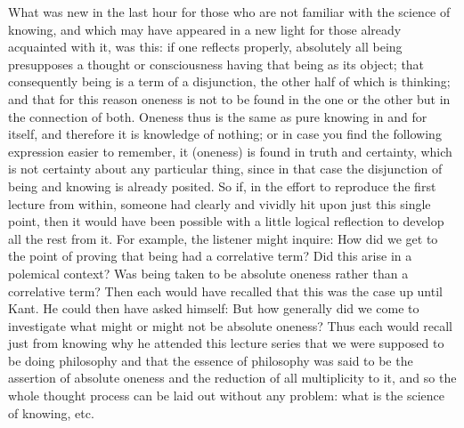 What was new in the last hour for those who are not familiar with
the science of knowing, and which may have appeared in a new light
for those already acquainted with it, was this:
if one reflects properly, absolutely all being presupposes
a thought or consciousness having that being as its object;
that consequently being is a term of a disjunction,
the other half of which is thinking;
and that for this reason oneness is not to be found
in the one or the other but in the connection of both.
Oneness thus is the same as pure knowing in and for itself,
and therefore it is knowledge of nothing;
or in case you find the following expression easier to remember,
it (oneness) is found in truth and certainty,
which is not certainty about any particular thing,
since in that case the disjunction of being and knowing is already posited.
So if, in the effort to reproduce the first lecture from within,
someone had clearly and vividly hit upon just this single point,
then it would have been possible with a little logical reflection
to develop all the rest from it.
For example, the listener might inquire:
How did we get to the point of proving that
being had a correlative term?
Did this arise in a polemical context?
Was being taken to be absolute oneness
rather than a correlative term?
Then each would have recalled that this was the case up until Kant.
He could then have asked himself:
But how generally did we come to investigate
what might or might not be absolute oneness?
Thus each would recall just from knowing
why he attended this lecture series that
we were supposed to be doing philosophy and
that the essence of philosophy was said to be
the assertion of absolute oneness
and the reduction of all multiplicity to it,
and so the whole thought process
can be laid out without any problem:
what is the science of knowing, etc.

